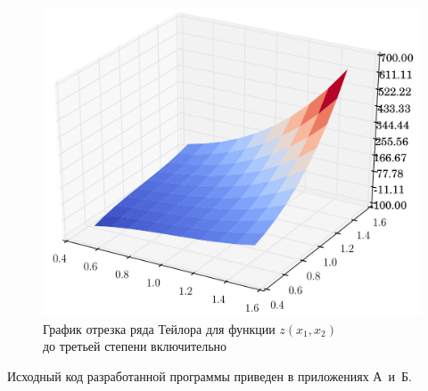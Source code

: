 \begin{figure}[h!]
  \centering
  \includegraphics[width=1\linewidth]{pic/taylor_2_3}
  \caption{График отрезка ряда Тейлора для функции $z(x_1, x_2)$ \\ до третьей степени включительно}
  \label{pic:taylor23}
\end{figure}

Исходный код разработанной программы приведен в приложениях А~и~Б.
